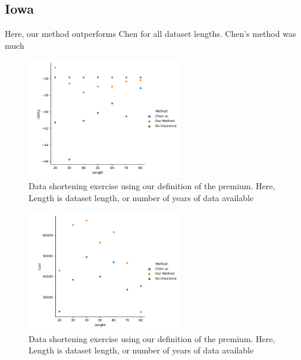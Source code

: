 \documentclass[11pt]{article}
\begin{document}
  \subsection{Iowa}
    Here, our method outperforms Chen for all dataset lengths. Chen's method was much 
    \begin{figure}[h]
        \centering
        \includegraphics[width=0.6\textwidth]{../../../output/figures/Evaluation/Iowa_Utility_Length_ml1.png}
        \caption{Data shortening exercise using our definition of the premium. Here, Length is dataset length, or number of years of data available}
        \end{figure}
        \FloatBarrier

        \begin{figure}[h]
        \centering
        \includegraphics[width=0.6\textwidth]{../../../output/figures/Evaluation/Iowa_Cost_Length_ml1.png}
        \caption{Data shortening exercise using our definition of the premium. Here, Length is dataset length, or number of years of data available}
        \end{figure}
        \FloatBarrier
\end{document}
